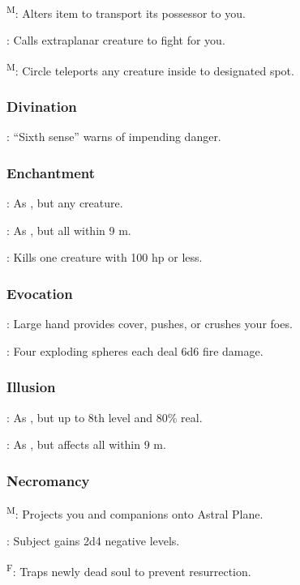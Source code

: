 	\textsuperscript{M}: Alters item to transport its possessor to you.

	: Calls extraplanar creature to fight for you.

	\textsuperscript{M}: Circle teleports any creature inside to designated spot.

\subsubsection{Divination}
	: “Sixth sense” warns of impending danger.

\subsubsection{Enchantment}
	: As , but any creature.

	: As , but all within 9 m.

	: Kills one creature with 100 hp or less.

\subsubsection{Evocation}
	: Large hand provides cover, pushes, or crushes your foes.

	: Four exploding spheres each deal 6d6 fire damage.

\subsubsection{Illusion}
	: As , but up to 8th level and 80\% real.

	: As , but affects all within 9 m.

\subsubsection{Necromancy}
	\textsuperscript{M}: Projects you and companions onto Astral Plane.

	: Subject gains 2d4 negative levels.

	\textsuperscript{F}: Traps newly dead soul to prevent resurrection.

